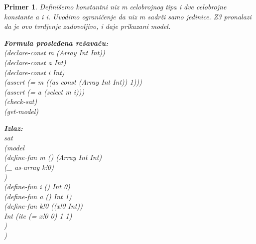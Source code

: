\documentclass[12pt,oneside]{memoir}
\newcommand\tab[1][0.5cm]{\hspace*{#1}}
\newtheorem{primer}{Primer}
\begin{document}
\begin{primer} Definišemo konstantni niz m celobrojnog tipa i dve celobrojne konstante a i i. Uvodimo ograničenje da niz m sadrži samo jedinice. Z3 pronalazi da je ovo tvrdjenje zadovoljivo, i daje prikazani model.\\
\begin{minipage}[b]{0.55\textwidth}
\vspace{0.5cm} 
\textbf{Formula prosleđena rešavaču:}
\\(declare-const m (Array Int Int))
\\(declare-const a Int)
\\(declare-const i Int)
\\(assert (= m ((as const (Array Int Int)) 1)))
\\(assert (= a (select m i)))
\\(check-sat)
\\(get-model)
\end{minipage}
\hspace{1.1cm} 
\begin{minipage}[t]{0.5\textwidth}
\vspace{-4.7cm}
\textbf{Izlaz:}
\\sat 
\\(model 
\\\tab(define-fun m () (Array Int Int) 
\\\tab\tab(\_ as-array k!0)
\\\tab) 
\\\tab(define-fun i () Int 0) 
\\\tab(define-fun a () Int 1) 
\\\tab(define-fun k!0 ((x!0 Int)) 
\\\tab\tab Int (ite (= x!0 0) 1 1)
\\\tab)
\\)
\end{minipage}
\end{primer}
\end{document}
